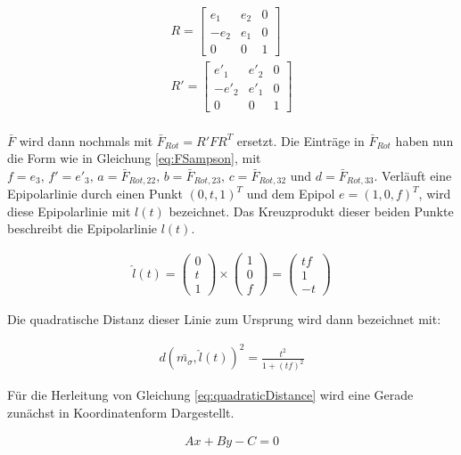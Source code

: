 \begin{gather}
	R = \begin{bmatrix}
		e_1&e_2&0\\
		-e_2&e_1&0\\
		0&0&1
	\end{bmatrix}\\
	R' = \begin{bmatrix}
	e'_1&e'_2&0\\
	-e'_2&e'_1&0\\
	0&0&1
\end{bmatrix}
\end{gather}\\

$\bar{F}$ wird dann nochmals mit $\bar{F}_{Rot} = R'FR^T$ ersetzt. Die Einträge in $\bar{F}_{Rot}$ haben nun die Form wie in Gleichung \ref{eq:FSampson}, mit $f = e_3, \, f' = e'_3, \, a = \bar{F}_{Rot,22}, \, b = \bar{F}_{Rot,23}, \, c = \bar{F}_{Rot,32}$ und $d = \bar{F}_{Rot,33}$.
Verläuft eine Epipolarlinie durch einen Punkt $(0,t,1)^T$ und dem Epipol $e = (1,0,f)^T$, wird diese Epipolarlinie mit $l(t)$ bezeichnet. Das Kreuzprodukt dieser beiden Punkte beschreibt die Epipolarlinie $l(t)$. 

\begin{gather}
\hat{l}(t)=
	\begin{pmatrix}
	0\\t\\1
	\end{pmatrix} \times
	\begin{pmatrix}
	1\\0\\f
	\end{pmatrix} = 
	\begin{pmatrix}
	tf\\1\\-t
	\end{pmatrix}
\end{gather}

Die quadratische Distanz dieser Linie zum Ursprung wird dann bezeichnet mit:


\begin{gather}
	d(\bar{m_\sigma},\hat{l}(t))^2 = \frac{t^2}{1+(tf)^2} \label{eq:quadraticDistance}
\end{gather}

Für die Herleitung von Gleichung \ref{eq:quadraticDistance} wird eine Gerade zunächst in Koordinatenform Dargestellt.

\begin{gather}
	Ax+By-C = 0
\end{gather}

